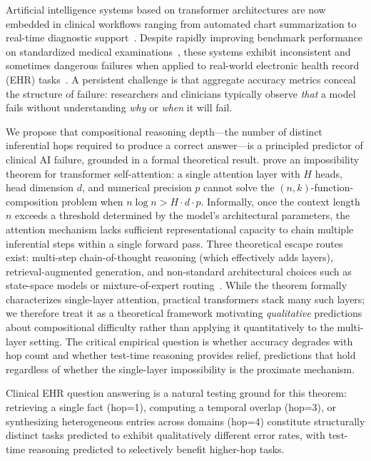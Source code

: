 \documentclass{article}
\begin{document}
Artificial intelligence systems based on transformer architectures are now
embedded in clinical workflows ranging from automated chart summarization to
real-time diagnostic support~\citep{singhal2023large,mcduff2025}.
Despite rapidly improving benchmark performance on standardized medical
examinations~\citep{jin2020disease,hendrycks2021measuring}, these systems
exhibit inconsistent and sometimes dangerous failures when applied to
real-world electronic health record (EHR) tasks~\citep{noharm2025}.
A persistent challenge is that aggregate accuracy metrics conceal the
structure of failure: researchers and clinicians typically observe \emph{that}
a model fails without understanding \emph{why} or \emph{when} it will fail.

We propose that compositional reasoning depth---the number of distinct
inferential hops required to produce a correct answer---is a principled
predictor of clinical AI failure, grounded in a formal theoretical result.
\citet{peng2024limitations} prove an impossibility theorem for transformer
self-attention: a single attention layer with $H$ heads, head dimension $d$,
and numerical precision $p$ cannot solve the $(n, k)$-function-composition
problem when $n \log n > H \cdot d \cdot p$. Informally, once the context
length $n$ exceeds a threshold determined by the model's architectural
parameters, the attention mechanism lacks sufficient representational capacity
to chain multiple inferential steps within a single forward pass.
Three theoretical escape routes exist: multi-step chain-of-thought reasoning
(which effectively adds layers), retrieval-augmented generation, and
non-standard architectural choices such as state-space models or mixture-of-expert routing~\citep{zhou2023brainformers,yehudai2025compositional}.
While the theorem formally characterizes single-layer attention, practical transformers
stack many such layers; we therefore treat it as a theoretical framework motivating
\emph{qualitative} predictions about compositional difficulty rather than applying it
quantitatively to the multi-layer setting. The critical empirical question is whether
accuracy degrades with hop count and whether test-time reasoning provides relief, predictions
that hold regardless of whether the single-layer impossibility is the proximate mechanism.

Clinical EHR question answering is a natural testing ground for this theorem: retrieving a single fact (hop=1), computing a temporal overlap (hop=3), or synthesizing heterogeneous entries across domains (hop=4) constitute structurally distinct tasks predicted to exhibit qualitatively different error rates, with test-time reasoning predicted to selectively benefit higher-hop tasks.
\end{document}
